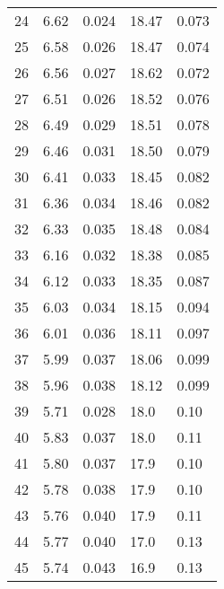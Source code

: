 \begin{table}
\begin{tabular}{c|ll|ll}
24 & 6.62 & 0.024 & 18.47 & 0.073 \\
25 & 6.58 & 0.026 & 18.47 & 0.074 \\
26 & 6.56 & 0.027 & 18.62 & 0.072 \\
27 & 6.51 & 0.026 & 18.52 & 0.076 \\
28 & 6.49 & 0.029 & 18.51 & 0.078 \\
29 & 6.46 & 0.031 & 18.50 & 0.079 \\
30 & 6.41 & 0.033 & 18.45 & 0.082 \\
31 & 6.36 & 0.034 & 18.46 & 0.082 \\
32 & 6.33 & 0.035 & 18.48 & 0.084 \\
33 & 6.16 & 0.032 & 18.38 & 0.085 \\
34 & 6.12 & 0.033 & 18.35 & 0.087 \\
35 & 6.03 & 0.034 & 18.15 & 0.094 \\
36 & 6.01 & 0.036 & 18.11 & 0.097 \\
37 & 5.99 & 0.037 & 18.06 & 0.099 \\
38 & 5.96 & 0.038 & 18.12 & 0.099 \\
39 & 5.71 & 0.028 & 18.0 & 0.10 \\
40 & 5.83 & 0.037 & 18.0 & 0.11 \\
41 & 5.80 & 0.037 & 17.9 & 0.10 \\
42 & 5.78 & 0.038 & 17.9 & 0.10 \\
43 & 5.76 & 0.040 & 17.9 & 0.11 \\
44 & 5.77 & 0.040 & 17.0 & 0.13 \\
45 & 5.74 & 0.043 & 16.9 & 0.13 \\
               \hline
        \end{tabular}
    \end{table}
    \clearpage

